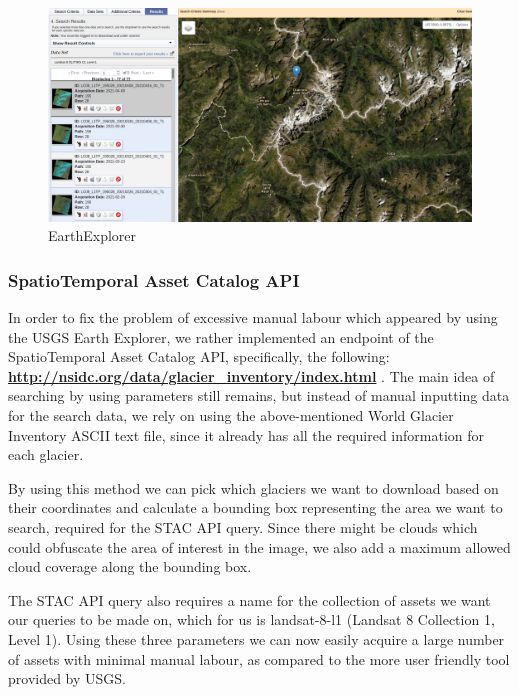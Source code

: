 \documentclass[12pt, a4paper]{report}
\begin{document}
	\begin{figure}[h]
		\centering
		\includegraphics[scale=0.25]{../images/EarthExplorer.png}
		\caption{EarthExplorer}
		\label{fig:EarthExplorer}
	\end{figure}
	
	\subsubsection{SpatioTemporal Asset Catalog API}
	\label{seq:STAC}
	
	\par In order to fix the problem of excessive manual labour which appeared by using the USGS Earth Explorer, we rather implemented an endpoint of the SpatioTemporal Asset Catalog API, specifically, the following: \textbf{\url{http://nsidc.org/data/glacier_inventory/index.html}} \cite{STAC}. The main idea of searching by using parameters still remains, but instead of manual inputting data for the search data, we rely on using the above-mentioned World Glacier Inventory ASCII text file, since it already has all the required information for each glacier.
	
	\par By using this method we can pick which glaciers we want to download based on their coordinates and calculate a bounding box representing the area we want to search, required for the STAC API query. Since there might be clouds which could obfuscate the area of interest in the image, we also add a maximum allowed cloud coverage along the bounding box.
	
	\par The STAC API query also requires a name for the collection of assets we want our queries to be made on, which for us is landsat-8-l1 (Landsat 8 Collection 1, Level 1). Using these three parameters we can now easily acquire a large number of assets with minimal manual labour, as compared to the more user friendly tool provided by USGS.
	
\end{document}

